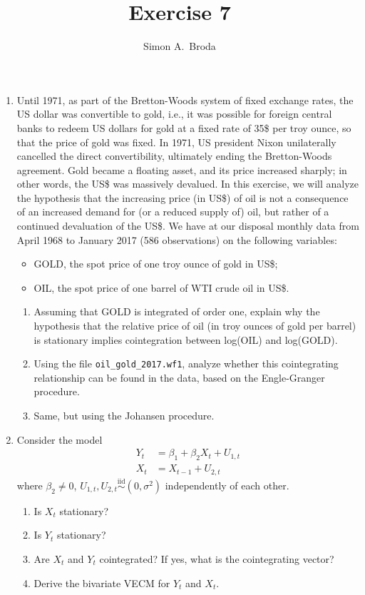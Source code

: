 \documentclass[11pt, a4paper]{article}
\begin{document}
\title{Exercise 7}
\author{Simon A.\ Broda}
\date{}
\maketitle

\begin{enumerate}

\item Until 1971, as part of the Bretton-Woods system of fixed exchange rates, the US dollar was convertible to gold, i.e., it was possible for foreign central banks to redeem US dollars for gold at a fixed rate of 35\$ per troy ounce, so that the price of gold was fixed. In 1971, US president Nixon unilaterally cancelled the direct convertibility, ultimately ending the Bretton-Woods agreement. Gold became a floating asset, and its price increased sharply; in other words, the US\$ was massively devalued. In this exercise, we will analyze the hypothesis that the increasing price (in US\$) of oil is not a consequence of an increased demand for (or a reduced supply of) oil, but rather of a continued devaluation of the US\$. We have at our disposal monthly data from April 1968 to January 2017 (586 observations) on the following variables:
\begin{itemize}
\item GOLD, the spot price of one troy ounce of gold in US\$;
\item OIL, the spot price of one barrel of WTI crude oil in US\$.
\end{itemize}
\begin{enumerate}
\item Assuming that GOLD is integrated of order one, explain why the hypothesis that the relative price of oil (in troy ounces of gold per barrel) is stationary implies cointegration between log(OIL) and log(GOLD).
\item Using the file \verb+oil_gold_2017.wf1+, analyze whether this cointegrating relationship can be found in the data, based on the Engle-Granger procedure.
\item Same, but using the Johansen procedure.
\end{enumerate}
\item
Consider the model
\begin{align*}
Y_t&=\beta_1 +\beta_2 X_t+U_{1,t}\\
X_t&=X_{t-1}+U_{2,t}
\end{align*}
where $\beta_2\neq0$, $U_{1,t},U_{2,t}\stackrel{\mathrm{iid}}{\sim}(0,\sigma^2)$ independently of each other.
\begin{enumerate}
\item Is $X_t$ stationary?
\item Is $Y_t$ stationary?
\item Are $X_t$ and $Y_t$ cointegrated? If yes, what is the cointegrating vector?
\item Derive the bivariate VECM for $Y_t$ and $X_t$.
\end{enumerate}





\end{enumerate}
\end{document}
